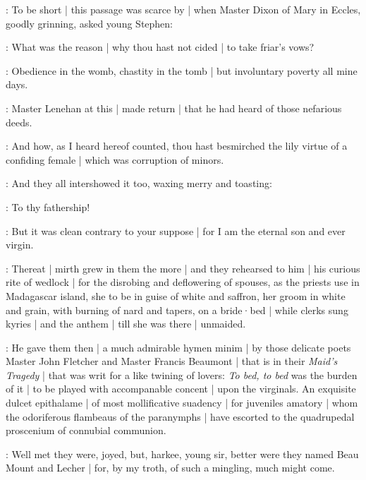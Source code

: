 

:
To be short |
this passage was scarce by |
when Master Dixon of Mary in Eccles,
goodly grinning,
asked young Stephen:

\dixon:
What was the reason |
why thou hast not cided |
to take friar's vows?

\stephen:
Obedience in the womb,
chastity in the tomb |
but involuntary poverty all mine days.

:
Master Lenehan at this |
made return |
that he had heard of those nefarious deeds.

\lenehan:
And how,
as I heard hereof counted,
thou hast besmirched the lily virtue of a confiding female |
which was corruption of minors.

:
And they all intershowed it too,
waxing merry and toasting:

\All:
To thy fathership!

\stephen:
But it was clean contrary to your suppose |
for I am the eternal son and ever virgin.

:
Thereat |
mirth grew in them the more |
and they rehearsed to him |
his curious rite of wedlock |
for the disrobing and deflowering of spouses,
as the priests use in Madagascar island,
she to be in guise of white and saffron,
her groom in white and grain,
with burning of nard and tapers,
on a bride·bed |
while clerks sung kyries |
and the anthem  |
till she was there |
unmaided.

:
He gave them then |
a much admirable hymen minim |
by those delicate poets Master John Fletcher and Master Francis Beaumont |
that is in their \emph{Maid's Tragedy} |
that was writ for a like twining of lovers:
\emph{To bed, to bed}
was the burden of it |
to be played with accompanable concent |
upon the virginals.
An exquisite dulcet epithalame |
of most mollificative suadency |
for juveniles amatory |
whom the odoriferous flambeaus of the paranymphs |
have escorted to the quadrupedal proscenium of connubial communion.

\dixon:
Well met they were,
joyed,
but,
harkee,
young sir,
better were they named Beau Mount and Lecher |
for,
by my troth,
of such a mingling,
much might come.

